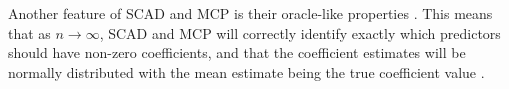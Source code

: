 \documentclass{article}
\begin{document}

	Another feature of SCAD and MCP is their oracle-like properties \cite{fan2001variable, zhang2010nearly}. This means that as $n\to\infty$, SCAD and MCP will correctly identify exactly which predictors should have non-zero coefficients, and that the coefficient estimates will be normally distributed with the mean estimate being the true coefficient value \cite{zou2006adaptive}.
	
\end{document}
